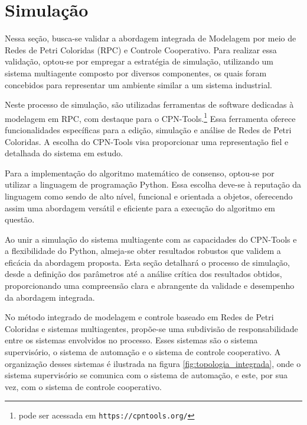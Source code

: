 \chapter{Simulação}
\label{chap:simulation}
Nessa seção, busca-se validar a abordagem integrada de Modelagem por meio de Redes de Petri Coloridas (RPC) e Controle Cooperativo. Para realizar essa validação, optou-se por empregar a estratégia de simulação, utilizando um sistema multiagente composto por diversos componentes, os quais foram concebidos para representar um ambiente similar a um sistema industrial.

Neste processo de simulação, são utilizadas ferramentas de software dedicadas à modelagem em RPC, com destaque para o CPN-Tools.\footnote{pode ser acessada em \texttt{https://cpntools.org/}} Essa ferramenta oferece funcionalidades específicas para a edição, simulação e análise de Redes de Petri Coloridas. A escolha do CPN-Tools visa proporcionar uma representação fiel e detalhada do sistema em estudo.

Para a implementação do algoritmo matemático de consenso, optou-se por utilizar a linguagem de programação Python. Essa escolha deve-se à reputação da linguagem como sendo de alto nível, funcional e orientada a objetos, oferecendo assim uma abordagem versátil e eficiente para a execução do algoritmo em questão.

Ao unir a simulação do sistema multiagente com as capacidades do CPN-Tools e a flexibilidade do Python, almeja-se obter resultados robustos que validem a eficácia da abordagem proposta. Esta seção detalhará o processo de simulação, desde a definição dos parâmetros até a análise crítica dos resultados obtidos, proporcionando uma compreensão clara e abrangente da validade e desempenho da abordagem integrada.

No método integrado de modelagem e controle baseado em Redes de Petri Coloridas e sistemas multiagentes, propõe-se uma subdivisão de responsabilidade entre os sistemas envolvidos no processo. Esses sistemas são o sistema supervisório, o sistema de automação e o sistema de controle cooperativo. A organização desses sistemas é ilustrada na figura \ref{fig:topologia_integrada}, onde o sistema supervisório se comunica com o sistema de automação, e este, por sua vez, com o sistema de controle cooperativo.

